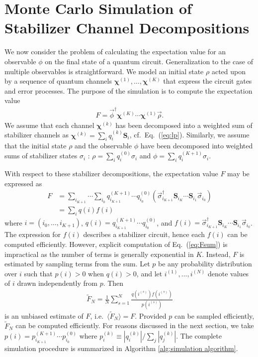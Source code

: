 \documentclass[twocolumn,pra]{revtex4}
\newcommand{\bs}[1]{\boldsymbol{#1}}
\begin{document}
\section{Monte Carlo Simulation of Stabilizer Channel Decompositions}
\label{sec:mc}
We now consider the problem of calculating the expectation value for an observable $\phi$ on the final state of a quantum circuit. Generalization to the case of multiple observables is straightforward. We model an initial state $\rho$ acted upon by a sequence of quantum channels $\bs{\chi}^{(1)},\ldots,\bs{\chi}^{(K)}$ that express the circuit gates and error processes. The purpose of the simulation is to compute the expectation value
\begin{gather}
F = \vec{\phi}^\dagger \bs{\chi}^{(K)}\cdots\bs{\chi}^{(1)} \vec{\rho}.
\end{gather}
We assume that each channel $\bs{\chi}^{(k)}$ has been decomposed into a weighted sum of stabilizer channels as
$\bs{\chi}^{(k)}=\sum_{i} q_{i}^{(k)}\mathbf{S}_{i}$, cf.~Eq.~(\ref{eq:lp}).
Similarly, we assume that the initial state $\rho$ and the observable $\phi$ have been decomposed into weighted sums of stabilizer states ${\sigma_i}$ \cite{garcia2015simulation,Yoder2012}:
$\rho=\sum_{i} q_{i}^{(0)} \sigma_{i}$ and $\phi = \sum_{i} q_{i}^{(K+1)}\sigma_{i}$.
\par
With respect to these stabilizer decompositions, the expectation value $F$ may be expressed as
\begin{align} \label{eq:Fsum}
F &= \sum_{i_{K+1}} \cdots \sum_{i_{0}}  q_{i_{K+1}}^{(K+1)} \cdots  q_{i_{0}}^{(0)} \left(  \vec{\sigma}_{i_{K+1}}^\dagger \mathbf{S}_{i_{K}} \cdots \mathbf{S}_{i_{1}} \vec{\sigma}_{i_{0}}\right) \\
 &= \sum_{i}  q(i) f(i)
\end{align}
where $i=(i_{0},\ldots,i_{K+1})$, $ q(i) =  q_{i_{K+1}}^{(K+1)}\cdots q_{i_{0}}^{(0)}$, and $f(i) = \vec{\sigma}_{i_{K+1}}^\dagger \mathbf{S}_{i_{K}} \cdots \mathbf{S}_{i_{1}} \vec{\sigma}_{i_{0}}$. The expression for $f(i)$ describes a stabilizer circuit, hence each $f(i)$ can be computed efficiently.  However, explicit computation of Eq.~(\ref{eq:Fsum}) is impractical as the number of terms is generally exponential in $K$. Instead, $F$ is estimated by sampling terms from the sum. Let $p$ be any probability distribution over $i$ such that $p(i) > 0$ when $q(i) > 0$, and let $i^{(1)},\ldots,i^{(N)}$ denote values of $i$ drawn independently from $p$. Then
\begin{gather}
\tilde{F}_{N} = \frac{1}{N} \sum_{s=1}^{N} \frac{ q(i^{(s)}) f(i^{(s)})}{p(i^{(s)})} \label{f_tilde}
\end{gather}
is an unbiased estimate of $F$, i.e.\ $\langle \tilde{F}_{N} \rangle = F$.  Provided $p$ can be sampled efficiently, $\tilde{F}_{N}$ can be computed efficiently. For reasons discussed in the next section,  we take  $ p(i) =  p^{(K+1)}_{i_{K+1}} \cdots p^{(0)}_{i_0} $ where $p^{(k)}_i \equiv | q^{(k)}_i| / \sum_j | q^{(k)}_j|$. The complete simulation procedure is summarized in Algorithm \ref{alg:simulation algorithm}.
\end{document}
